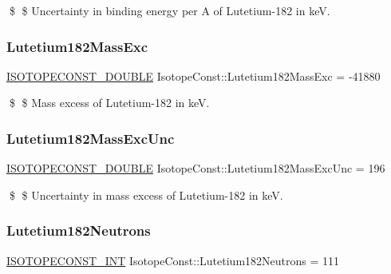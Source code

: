 \$ \$ Uncertainty in binding energy per A of Lutetium-\/182 in keV. \mbox{\label{group___isotope_const-_lutetium-_lu182_gad0fae66ed18a58c72f4451c06cd4dddf}} 
\subsubsection{\texorpdfstring{Lutetium182\+Mass\+Exc}{Lutetium182MassExc}}
{\footnotesize\ttfamily \mbox{\hyperlink{group___isotope_const-_macros_ga8f45a7272ce02c0b4c65c44636ed719a}{I\+S\+O\+T\+O\+P\+E\+C\+O\+N\+S\+T\+\_\+\+D\+O\+U\+B\+LE}} Isotope\+Const\+::\+Lutetium182\+Mass\+Exc = -\/41880}

\$ \$ Mass excess of Lutetium-\/182 in keV. \mbox{\label{group___isotope_const-_lutetium-_lu182_ga109f353798bfbc2a426a79568d67d6d8}} 
\subsubsection{\texorpdfstring{Lutetium182\+Mass\+Exc\+Unc}{Lutetium182MassExcUnc}}
{\footnotesize\ttfamily \mbox{\hyperlink{group___isotope_const-_macros_ga8f45a7272ce02c0b4c65c44636ed719a}{I\+S\+O\+T\+O\+P\+E\+C\+O\+N\+S\+T\+\_\+\+D\+O\+U\+B\+LE}} Isotope\+Const\+::\+Lutetium182\+Mass\+Exc\+Unc = 196}

\$ \$ Uncertainty in mass excess of Lutetium-\/182 in keV. \mbox{\label{group___isotope_const-_lutetium-_lu182_gac954a6d8a738e3d5cd0f38f907db15c6}} 
\subsubsection{\texorpdfstring{Lutetium182\+Neutrons}{Lutetium182Neutrons}}
{\footnotesize\ttfamily \mbox{\hyperlink{group___isotope_const-_macros_ga5f18360b3e99483a35c32d789e62621c}{I\+S\+O\+T\+O\+P\+E\+C\+O\+N\+S\+T\+\_\+\+I\+NT}} Isotope\+Const\+::\+Lutetium182\+Neutrons = 111}

